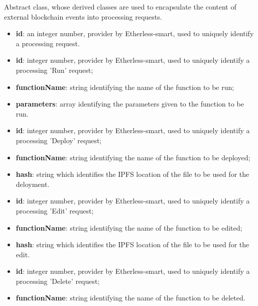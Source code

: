 	Abstract class, whose derived classes are used to encapsulate the content of external blockchain events into processing requests.
	\begin{itemize}
		\item \textbf{id}: an integer number, provider by Etherless-smart, used to uniquely identify a processing request.
	\end{itemize}
	\begin{itemize}
		\item \textbf{id}: integer number, provider by Etherless-smart, used to uniquely identify a processing 'Run' request;
		\item \textbf{functionName}: string identifying the name of the function to be run;
		\item \textbf{parameters}: array identifying the parameters given to the function to be run.
	\end{itemize}
	\begin{itemize}
		\item \textbf{id}: integer number, provider by Etherless-smart, used to uniquely identify a processing 'Deploy' request;
		\item \textbf{functionName}: string identifying the name of the function to be deployed;
		\item \textbf{hash}: string which identifies the IPFS location of the file to be used for the deloyment.
	\end{itemize}
	\begin{itemize}
		\item \textbf{id}: integer number, provider by Etherless-smart, used to uniquely identify a processing 'Edit' request;
		\item \textbf{functionName}: string identifying the name of the function to be edited;
		\item \textbf{hash}: string which identifies the IPFS location of the file to be used for the edit.
	\end{itemize}
	\begin{itemize}
		\item \textbf{id}: integer number, provider by Etherless-smart, used to uniquely identify a processing 'Delete' request;
		\item \textbf{functionName}: string identifying the name of the function to be deleted.
	\end{itemize}

